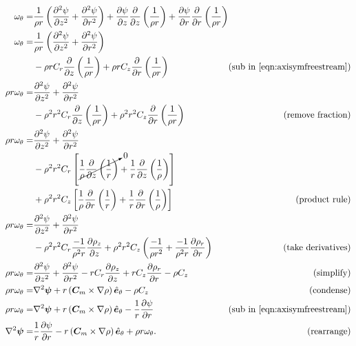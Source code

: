 \begin{equation}
    \label{eqn:poissonpsi}
    \begin{alignedat}{2}
        \omega_\theta =& \frac{1}{\rho r} \left(\pdd{\psi}{z} + \pdd{\psi}{r} \right) + \pd{\psi}{z} \pd{}{z}\left( \frac{1}{\rho r} \right) + \pd{\psi}{r} \pd{}{r}\left( \frac{1}{\rho r} \right) \\
        \omega_\theta =& \frac{1}{\rho r} \left(\pdd{\psi}{z} + \pdd{\psi}{r} \right) \\
                       &- \rho r C_r \pd{}{z}\left( \frac{1}{\rho r} \right) + \rho r C_z \pd{}{r}\left( \frac{1}{\rho r} \right) & \text{(sub in \cref{eqn:axisymfreestream})}\\
        \rho r \omega_\theta =&  \pdd{\psi}{z} + \pdd{\psi}{r} \\
                              &- \rho^2 r^2 C_r \pd{}{z}\left( \frac{1}{\rho r} \right) + \rho^2 r^2 C_z \pd{}{r}\left( \frac{1}{\rho r} \right) & \text{(remove fraction)}\\
        \rho r \omega_\theta =&  \pdd{\psi}{z} + \pdd{\psi}{r} \\
                              &- \rho^2 r^2 C_r \left[\cancelto{0}{\frac{1}{\rho}\pd{}{z}\left( \frac{1}{r} \right)} + \frac{1}{r}\pd{}{z}\left( \frac{1}{\rho} \right)\right] \\
                              &+ \rho^2 r^2 C_z \left[\frac{1}{\rho}\pd{}{r}\left( \frac{1}{r} \right) + \frac{1}{r}\pd{}{r}\left( \frac{1}{\rho} \right)\right]& \text{(product rule)}\\
        \rho r \omega_\theta =&  \pdd{\psi}{z} + \pdd{\psi}{r} \\
                              &- \rho^2 r^2 C_r \frac{-1}{\rho^2 r}\pd{\rho_z}{z} + \rho^2 r^2 C_z \left(\frac{-1}{\rho r^2} + \frac{-1}{\rho^2 r}\pd{\rho_r}{r}\right)& \text{(take derivatives)}\\
        \rho r \omega_\theta =&  \pdd{\psi}{z} + \pdd{\psi}{r} - r C_r \pd{\rho_z}{z}
                              + r C_z \pd{\rho_r}{r} - \rho C_z & \text{(simplify)}\\
        \rho r \omega_\theta =&  \nabla^2\vect{\psi} + r \left(\vect{C}_m \times \nabla\rho\right) \hat{\vect{e}}_\theta - \rho C_z & \text{(condense)}\\
        \rho r \omega_\theta =&  \nabla^2\vect{\psi} + r \left(\vect{C}_m \times \nabla\rho\right) \hat{\vect{e}}_\theta - \frac{1}{r} \pd{\psi}{r} & \text{(sub in \cref{eqn:axisymfreestream})}\\
        \nabla^2\vect{\psi} =& \frac{1}{r} \pd{\psi}{r} - r \left(\vect{C}_m \times \nabla\rho\right) \hat{\vect{e}}_\theta + \rho r \omega_\theta.  & \text{(rearrange)}\\
\end{alignedat}
\end{equation}

